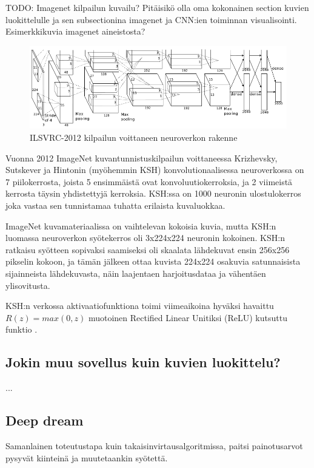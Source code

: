 \documentclass[finnish]{tktltiki2}
\theoremstyle{definition}
\theoremstyle{remark}
\begin{document}
    TODO: Imagenet kilpailun kuvailu? Pitäisikö olla oma kokonainen section kuvien luokittelulle ja sen subsectionina imagenet ja CNN:ien toiminnan visualisointi. Esimerkkikuvia imagenet aineistosta?

    \begin{figure}[h]
    \centering
    \includegraphics[scale=0.4]{imagenet}
    \caption{ILSVRC-2012 kilpailun voittaneen neuroverkon rakenne \cite{KSHimagenet2012}}
    \label{pic:hsk-neuralnet}
    \end{figure}

    Vuonna 2012 ImageNet kuvantunnistuskilpailun voittaneessa Krizhevsky, Sutskever ja Hintonin (myöhemmin KSH) konvolutionaalisessa neuroverkossa on 7 piilokerrosta, joista 5 ensimmäistä ovat konvoluutiokerroksia, ja 2 viimeistä kerrosta täysin yhdistettyjä kerroksia. KSH:ssa on 1000 neuronin ulostulokerros joka vastaa sen tunnistamaa tuhatta erilaista kuvaluokkaa.
    
    ImageNet kuvamateriaalissa on vaihtelevan kokoisia kuvia, mutta KSH:n luomassa neuroverkon syötekerros oli 3x224x224 neuronin kokoinen. KSH:n ratkaisu syötteen sopivaksi saamiseksi oli skaalata lähdekuvat ensin 256x256 pikselin kokoon, ja tämän jälkeen ottaa kuvista 224x224 osakuvia satunnaisista sijainneista lähdekuvasta, näin laajentaen harjoitusdataa ja vähentäen ylisovitusta.
    
    KSH:n verkossa aktivaatiofunktiona toimi viimeaikoina hyväksi havaittu $R(z) = max(0, z)$ muotoinen Rectified Linear Unitiksi (ReLU) kutsuttu funktio \cite{KSHimagenet2012}.

  \subsection{Jokin muu sovellus kuin kuvien luokittelu?}
  ...
  \subsection{Deep dream}
  Samanlainen toteutustapa kuin takaisinvirtausalgoritmissa, paitsi painotusarvot pysyvät kiinteinä ja muutetaankin syötettä.
\end{document}
